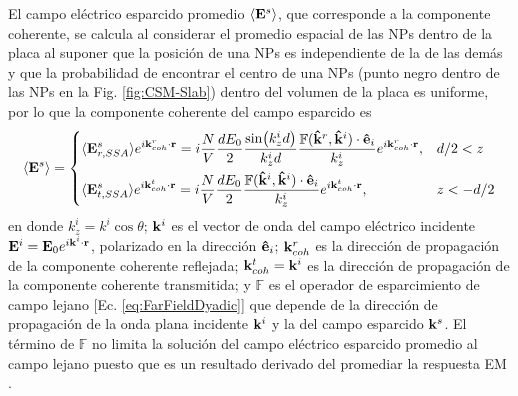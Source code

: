 El  campo eléctrico esparcido promedio $\langle \vb{E}^s\rangle$, que corresponde a la componente coherente, se calcula al considerar el promedio espacial de las NPs dentro de la placa al suponer que la posición de una NPs es independiente de la de las demás y que la probabilidad de encontrar el centro de una NPs (punto negro dentro de las NPs en la Fig. \ref{fig:CSM-Slab}) dentro del volumen de la placa es uniforme, por lo que la componente coherente del campo esparcido es  \cite{garcia2012multiple} 
	\begin{align}
	\langle \vb{E}^s\rangle =
	\begin{dcases} 
	      \langle \vb{E}^s_{r,SSA}\rangle e^{i\vb{k}^r_{coh}\cdot\vb{r}} =
	    			i \frac{N}{V}  \frac{d E_0}{2} \frac{\sin(k_z^id)}{k_z^i d} 
				\frac{\mathbb{F}(\vu{k}^r,\vu{k}^i)\cdot \vu{e}_i}{k_z^i }	e^{i\vb{k}^r_{coh}\cdot\vb{r}},									& d/2<z \\
      \langle \vb{E}^s_{t,SSA}\rangle e^{i\vb{k}^t_{coh}\cdot\vb{r}} =
 				i\frac{N}{V} \frac{d E_0}{2}\frac{\mathbb{F}(\vu{k}^i,\vu{k}^i)\cdot \vu{e}_i}{k_z^i}		
				e^{i\vb{k}^t_{coh}\cdot\vb{r}},
							& z<-d/2
   \end{dcases}
   	\label{eq:AvErEt}
	\end{align}
en donde $k^i_z = k^i\cos\theta$; $\vb{k}^i$ es el vector de onda del campo eléctrico incidente $\vb{E}^i = \vb{E}_0 e^{i\vb{k}^i\cdot\vb{r}}$, polarizado en la dirección $\vu{e}_i$; $\vb{k}^r_{coh}$ es la dirección de propagación de la componente coherente reflejada; $\vb{k}^t_{coh}=\vb{k}^i$ es la dirección de propagación de la componente coherente transmitida; y $\mathbb{F}$ es el operador de esparcimiento de campo lejano [Ec. \eqref{eq:FarFieldDyadic}] que depende de la dirección de propagación de la onda plana incidente $\vb{k}^i$ y la del campo esparcido $\vb{k}^s$. El término de $\mathbb{F}$ no limita la solución del campo eléctrico esparcido promedio al campo lejano puesto que es un resultado derivado del promediar la respuesta EM \cite{gutierrez2012overview}.

